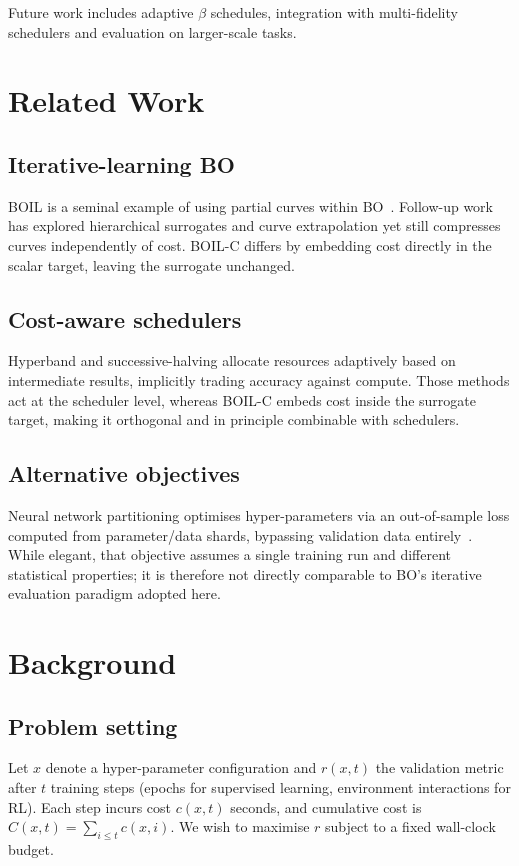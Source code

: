 \documentclass{article} %
\begin{document}
Future work includes adaptive \(\beta\) schedules, integration with multi-fidelity schedulers and evaluation on larger-scale tasks.

\section{Related Work}\label{sec:related}%
\subsection{Iterative-learning BO}
BOIL is a seminal example of using partial curves within BO~\cite{nguyen-2019-bayesian}. Follow-up work has explored hierarchical surrogates and curve extrapolation yet still compresses curves independently of cost. BOIL-C differs by embedding cost directly in the scalar target, leaving the surrogate unchanged.

\subsection{Cost-aware schedulers}
Hyperband and successive-halving allocate resources adaptively based on intermediate results, implicitly trading accuracy against compute. Those methods act at the scheduler level, whereas BOIL-C embeds cost inside the surrogate target, making it orthogonal and in principle combinable with schedulers.

\subsection{Alternative objectives}
Neural network partitioning optimises hyper-parameters via an out-of-sample loss computed from parameter/data shards, bypassing validation data entirely~\cite{mlodozeniec-2023-hyperparameter}. While elegant, that objective assumes a single training run and different statistical properties; it is therefore not directly comparable to BO's iterative evaluation paradigm adopted here.

\section{Background}\label{sec:background}%
\subsection{Problem setting}
Let \(x\) denote a hyper-parameter configuration and \(r(x,t)\) the validation metric after \(t\) training steps (epochs for supervised learning, environment interactions for RL). Each step incurs cost \(c(x,t)\) seconds, and cumulative cost is \(C(x,t)=\sum_{i\le t} c(x,i)\). We wish to maximise \(r\) subject to a fixed wall-clock budget.
\end{document}
